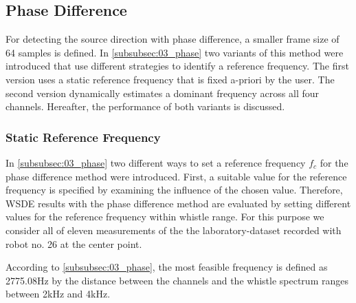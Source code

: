 \subsection{Phase Difference}
\label{subsec:04_phaseSingle}

For detecting the source direction with phase difference, a smaller frame
size of 64 samples is defined.
In \cref{subsubsec:03_phase} two variants of this method were introduced that use
different strategies to identify a reference frequency. The first version uses
a static reference frequency that is fixed a-priori by the user. The second version
dynamically estimates a dominant frequency across all four channels. Hereafter,
the performance of both variants is discussed.


\subsubsection*{Static Reference Frequency}

In \cref{subsubsec:03_phase} two different ways to set a reference frequency $f_c$
for the phase difference method were introduced.
First, a suitable value for the reference frequency is specified by
examining the influence of the chosen value.
Therefore, \ac{WSDE} results with the phase difference method are evaluated by setting
different values for the reference frequency within whistle range.
For this purpose we consider all of eleven measurements of the the laboratory-dataset
recorded with robot no. 26 at the center point.

According to \cref{subsubsec:03_phase}, the most feasible frequency is defined as
2775.08\si{\hertz} by the distance between the channels
and the whistle spectrum ranges between 2\si{\kilo\hertz}
and 4\si{\kilo\hertz}.

